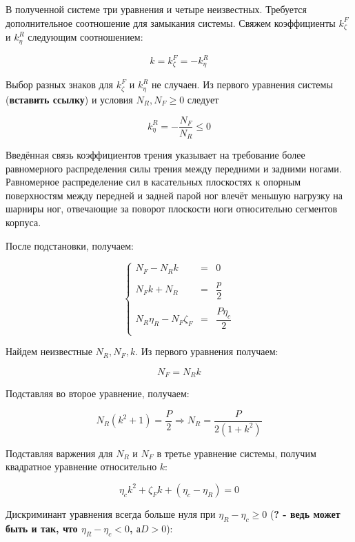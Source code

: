 В полученной системе три уравнения и четыре неизвестных. Требуется дополнительное соотношение для замыкания системы. Свяжем коэффициенты $k_\zeta^F$ и $k_\eta^R$ следующим соотношением:

\begin{equation}
k = k_\zeta^F = -k_\eta^R
\end{equation}

Выбор разных знаков для $k_\zeta^F$ и $k_\eta^R$ не случаен. Из первого уравнения системы (\textbf{вставить ссылку}) и условия $N_R,N_F \ge 0$ следует

$$
k_\eta^R = -\dfrac{N_F}{N_R} \leq 0
$$


Введённая связь коэффициентов трения указывает на требование более равномерного распределения силы трения между передними и задними ногами. Равномерное распределение сил в касательных плоскостях к опорным поверхностям между передней и задней парой ног влечёт меньшую нагрузку на шарниры ног, отвечающие за поворот плоскости ноги относительно сегментов корпуса.

После подстановки, получаем:

\begin{equation}
\left\{
\begin{array}{rcl}
    N_F-N_Rk &=& 0\\
    \\
    N_Fk+N_R &=& \dfrac{p}{2}\\
    \\
    N_R\eta_R-N_F\zeta_F &=& \dfrac{P\eta_c}{2}\\
\end{array}
\right.
\end{equation}

Найдем неизвестные $N_R, N_F, k$. Из первого уравнения получаем:

$$
N_F = N_Rk
$$

Подставляя во второе уравнение, получаем:

$$
N_R(k^2+1) = \dfrac{P}{2} \Rightarrow N_R = \dfrac{P}{2(1+k^2)}
$$

Подставляя варжения для $N_R$ и $N_F$ в третье уравнение системы, получим квадратное уравнение относительно $k$:

\begin{equation}
\eta_ck^2+\zeta_Fk+(\eta_c-\eta_R) = 0
\end{equation}

Дискриминант уравнения всегда больше нуля при $\eta_R-\eta_c\geq0$ (\textbf{? - ведь может быть и так, что $\eta_R-\eta_c < 0$, $а D>0$}):

